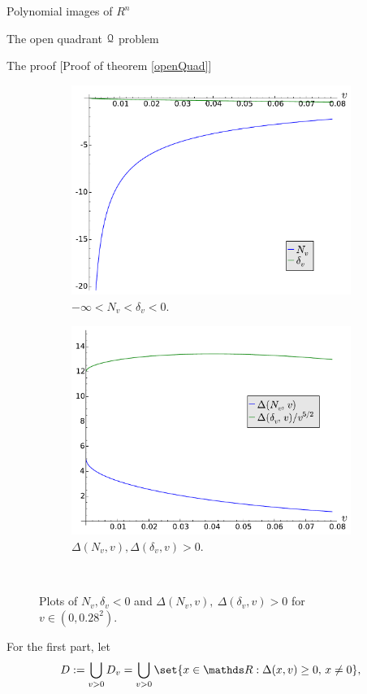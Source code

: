 \documentclass[11pt, a4paper, english, twoside, notitlepage, openright]{report}
\begin{document}
\begin{chapter}{Polynomial images of $R^n$}
\begin{section}{The open quadrant $\mathcal{Q}$ problem}
\begin{subsection}{The proof} [Proof of theorem \ref{openQuad}]
\begin{figure}[h]
\begin{subfigure}{.56\linewidth}
\includegraphics[width=1\textwidth]{plots/ch1_13_comp.pdf}
\caption{$-\infty<N_v<\delta_v<0$.\label{fig:comp}}
\end{subfigure}
\begin{subfigure}{.6\linewidth}\centering
\includegraphics[width=1\textwidth]{plots/ch1_14_positive.pdf}
\caption{$\Delta(N_{v}, v), \Delta(\delta_{v},v) > 0$.\label{fig:positive}}
\end{subfigure}\\[1ex]
\caption{Plots of $N_v,\delta_v<0$ and $\Delta(N_{v},v),\ \Delta(\delta_{v},v)>0$ for $v\in(0, 0.28^2)$.\label{fig:N_delta}}
\end{figure} For the first part, let 
$$
D:=\bigcup_{v>0}D_v=\bigcup_{v>0}\set{x\in\R:\Delta(x,v)\geq 0,\,x\neq 0},
$$
\end{subsection}
\end{section}
\end{chapter}
\end{document}
